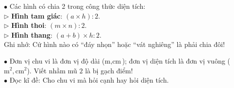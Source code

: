 \documentclass[14pt,a4paper,oneside]{extbook}
\begin{document}
\noindent
\begin{minipage}[t]{0.54\textwidth}
  \begin{tcolorbox}[
    enhanced,
    title={\footnotesize\bfseries\color{white}\faBolt\ Mẹo nhớ mẫu số chia 2},
    colback=green!3!white,
    colframe=green!60!black,
    arc=2.5mm, boxrule=0.8pt, top=1.8mm, bottom=1.8mm, left=2.2mm, right=2.2mm
  ]
    \footnotesize
    $\bullet$ Các hình có chia 2 trong công thức diện tích:\\
    $\triangleright$ \textbf{Hình tam giác}: $(a \times h) : 2$.\\
    $\triangleright$ \textbf{Hình thoi}: $(m \times n) : 2$.\\
    $\triangleright$ \textbf{Hình thang}: $(a + b) \times h : 2$.\\
    Ghi nhớ: Cứ hình nào có ``đáy nhọn'' hoặc ``vát nghiêng'' là phải chia đôi!
  \end{tcolorbox}
\end{minipage}%
\hfill
\begin{minipage}[t]{0.44\textwidth}
  \begin{tcolorbox}[
    enhanced,
    title={\footnotesize\bfseries\color{white}\faExclamationTriangle\ Mẹo tránh bẫy trắc nghiệm},
    colback=red!2!white,
    colframe=red!70!black,
    arc=2.5mm, boxrule=0.8pt, top=1.8mm, bottom=1.8mm, left=2.2mm, right=2.2mm
  ]
    \footnotesize
    $\bullet$ Đơn vị chu vi là đơn vị độ dài ($\text{m}, \text{cm}$); đơn vị diện tích là đơn vị vuông ($\text{m}^2, \text{cm}^2$). Viết nhầm mũ $2$ là bị gạch điểm!\\
    $\bullet$ Đọc kĩ đề: Cho chu vi mà hỏi cạnh hay hỏi diện tích.
  \end{tcolorbox}
\end{minipage}
\end{document}

